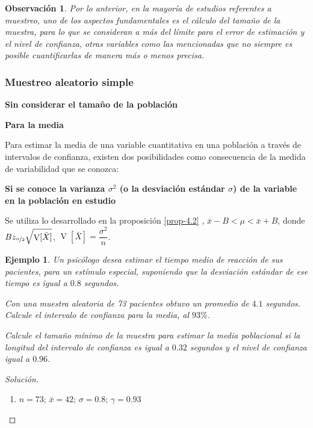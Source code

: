 \documentclass[a5paper,doc,10pt,noapacite]{apa6}
\DeclareMathOperator{\Var}{V}
\newtheorem{observ}{Observación}
\newtheorem{ejem}{Ejemplo}
\newcommand{\neodefi}[1]{%
	\vspace{1\baselineskip}
	\textbf{\small#1} \newline
}
\begin{document}
{{\begin{observ}
Por lo anterior, en la mayoría de estudios referentes a muestreo, uno de los aspectos fundamentales es el cálculo del tamaño de la muestra, para lo que se consideran a más del límite para el error de estimación y el nivel de confianza, otras variables como las mencionadas que no siempre es posible cuantificarlas
de manera más o menos precisa.
\end{observ}



%
\subsubsection{Muestreo aleatorio simple}

\neodefi{Sin considerar el tamaño de la población}

\neodefi{Para la media} 

Para estimar la media de una variable cuantitativa en una población a través de intervalos de confianza, existen dos posibilidades como consecuencia de la medida de variabilidad que se conozca:

\vspace{0.75\baselineskip}
	\textbf{Si se conoce la varianza \(\sigma^2\) (o la desviación estándar \(\sigma\)) de la variable en la población en estudio}\newline


Se utiliza lo desarrollado en la proposición \eqref{prop-4.2} \(\), \(\bar{x}-B<\mu<\bar{x}+B\), donde \(Bz_{\nicefrac{\alpha}{2}} 	\sqrt{\Var[\bar{X}]}\), \(\Var[\bar{X}]=\dfrac{\sigma^2}{n}\).

\begin{ejem}
	Un psicólogo desea estimar el tiempo medio de reacción de sus pacientes, para un estímulo especial, suponiendo que la desviación estándar de ese tiempo es igual a \(0.8\) segundos.
	\begin{APAenumerate}
		\item Con una muestra aleatoria de 73 pacientes obtuvo un promedio de \(4.1\) segundos. Calcule el intervalo de confianza para la media, al \(93\%\).
		\item Calcule el tamaño mínimo de la muestra para estimar la media poblacional si la longitud del intervalo de confianza es igual a \(0.32\) segundos y el nivel de confianza igual a \(0.96\).
	\end{APAenumerate}
\end{ejem}

\begin{proof}[Solución]\quad
	\begin{enumerate}
		\item \(n=73\); \(\bar{x}=42\); \(\sigma=0.8\); \(\gamma=0.93\)
		

\end{enumerate}
\end{proof}}}
\end{document}
